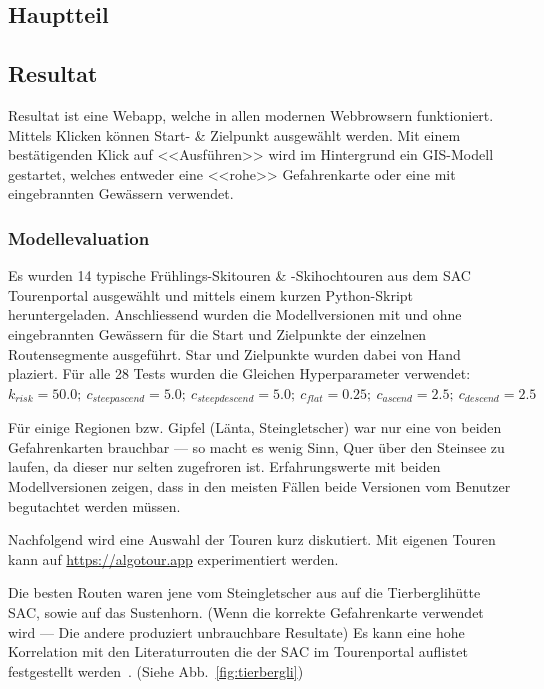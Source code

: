 \begin{multicols}{2}
\section{Hauptteil}
\subsection{Resultat}

Resultat ist eine Webapp, welche in allen modernen Webbrowsern funktioniert. Mittels Klicken können Start- \& Zielpunkt ausgewählt werden. Mit einem bestätigenden Klick auf <<Ausführen>> wird im Hintergrund ein GIS-Modell gestartet, welches entweder eine <<rohe>> Gefahrenkarte oder eine mit eingebrannten Gewässern verwendet.

\subsubsection{Modellevaluation}

Es wurden 14 typische Frühlings-Skitouren \& -Skihochtouren aus dem SAC Tourenportal ausgewählt und mittels einem kurzen Python-Skript heruntergeladen. Anschliessend wurden die Modellversionen mit und ohne eingebrannten Gewässern für die Start und Zielpunkte der einzelnen Routensegmente ausgeführt. Star und Zielpunkte wurden dabei von Hand plaziert. Für alle 28 Tests wurden die Gleichen Hyperparameter verwendet: $k_{risk}={50.0};\ c_{steepascend}={5.0};\ c_{steepdescend}={5.0};\ c_{flat}={0.25};\ c_{ascend}={2.5};\ c_{descend}={2.5}$

Für einige Regionen bzw. Gipfel (Länta, Steingletscher) war nur eine von beiden Gefahrenkarten brauchbar --- so macht es wenig Sinn, Quer über den Steinsee zu laufen, da dieser nur selten zugefroren ist. Erfahrungswerte mit beiden Modellversionen zeigen, dass in den meisten Fällen beide Versionen vom Benutzer begutachtet werden müssen.


Nachfolgend wird eine Auswahl der Touren kurz diskutiert. Mit eigenen Touren kann auf \url{https://algotour.app} experimentiert werden.

Die besten Routen waren jene vom Steingletscher aus auf die Tierberglihütte SAC, sowie auf das Sustenhorn. (Wenn die korrekte Gefahrenkarte verwendet wird --- Die andere produziert unbrauchbare Resultate) Es kann eine hohe Korrelation mit den Literaturrouten die der SAC im Tourenportal auflistet festgestellt werden~\cite{mmzentralch}. (Siehe Abb.\ \ref{fig:tierbergli})


\end{multicols}
